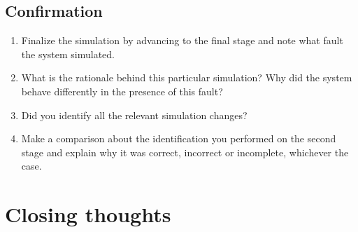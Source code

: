 \documentclass[10pt,a4paper,draft]{article}
\begin{document}
	\subsection{Confirmation}
	\begin{enumerate}
		\item Finalize the simulation by advancing to the final stage and note what fault the system simulated.
		\item What is the rationale behind this particular simulation? Why did the system behave differently in
		the presence of this fault?
		\item Did you identify all the relevant simulation changes?
		\item Make a comparison about the identification you performed on the second stage and explain why
		it was correct, incorrect or incomplete, whichever the case.
	\end{enumerate}
	
	\section{Closing thoughts}
	\blindtext
		
\end{document}
